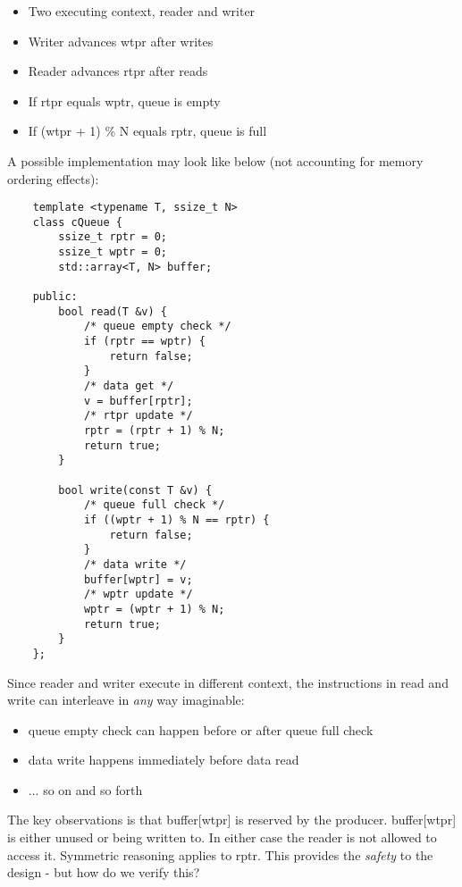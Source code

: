 \documentclass{report}
\begin{document}
\begin{itemize}
    \item Two executing context, reader and writer
    \item Writer advances wtpr after writes
    \item Reader advances rtpr after reads
    \item If rtpr equals wptr, queue is empty
    \item If (wtpr + 1) \% N equals rptr, queue is full
\end{itemize}

A possible implementation may look like below (not accounting for memory
ordering effects):
\begin{lstlisting}
    template <typename T, ssize_t N>
    class cQueue { 
        ssize_t rptr = 0;
        ssize_t wptr = 0; 
        std::array<T, N> buffer;

    public:
        bool read(T &v) { 
            /* queue empty check */
            if (rptr == wptr) { 
                return false;
            }
            /* data get */
            v = buffer[rptr]; 
            /* rtpr update */
            rptr = (rptr + 1) % N;
            return true;
        }

        bool write(const T &v) { 
            /* queue full check */
            if ((wptr + 1) % N == rptr) { 
                return false;
            }
            /* data write */
            buffer[wptr] = v;
            /* wptr update */
            wptr = (wptr + 1) % N;
            return true;
        }
    };
\end{lstlisting}

Since reader and writer execute in different context, the instructions in read
and write can interleave in \textit{any} way imaginable:
\begin{itemize}
    \item queue empty check can happen before or after queue full check
    \item data write happens immediately before data read
    \item ... so on and so forth
\end{itemize}

The key observations is that buffer[wtpr] is reserved by the producer.
buffer[wtpr] is either unused or being written to. In either case the reader is
not allowed to access it. Symmetric reasoning applies to rptr. This provides
the \textit{safety} to the design - but how do we verify this?\newline
\end{document}
